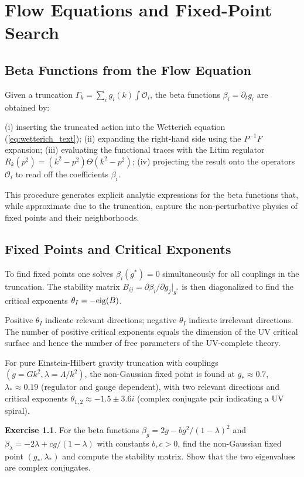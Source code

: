 \documentclass[12pt,a4paper,oneside]{book}
\theoremstyle{definition}
\newtheorem{exercise}{Exercise}[chapter]
\theoremstyle{plain}
\theoremstyle{remark}
\begin{document}
\chapter{Flow Equations and Fixed-Point Search}

\section{Beta Functions from the Flow Equation}

Given a truncation $\Gamma_k = \sum_i g_i(k)\int\mathcal{O}_i$, the beta
functions $\beta_i = \partial_t g_i$ are obtained by:

(i) inserting the truncated action into the Wetterich equation (\ref{eq:wetterich_text});
(ii) expanding the right-hand side using the $P^{-1}F$ expansion;
(iii) evaluating the functional traces with the Litim regulator
$R_k(p^2) = (k^2 - p^2)\Theta(k^2 - p^2)$;
(iv) projecting the result onto the operators $\mathcal{O}_i$ to read off the
coefficients $\beta_i$.

This procedure generates explicit analytic expressions for the beta functions
that, while approximate due to the truncation, capture the non-perturbative
physics of fixed points and their neighborhoods.

\section{Fixed Points and Critical Exponents}

To find fixed points one solves $\beta_i(g^*) = 0$ simultaneously for all
couplings in the truncation. The stability matrix $B_{ij} = \partial\beta_i/\partial g_j|_{g^*}$
is then diagonalized to find the critical exponents $\theta_I = -{\rm eig}(B)$.

Positive $\theta_I$ indicate relevant directions; negative $\theta_I$ indicate
irrelevant directions. The number of positive critical exponents equals the
dimension of the UV critical surface and hence the number of free parameters
of the UV-complete theory.

For pure Einstein-Hilbert gravity truncation with couplings $(g = Gk^2, \lambda = \Lambda/k^2)$,
the non-Gaussian fixed point is found at $g_* \approx 0.7$, $\lambda_* \approx 0.19$
(regulator and gauge dependent), with two relevant directions and critical
exponents $\theta_{1,2} \approx -1.5 \pm 3.6i$ (complex conjugate pair indicating
a UV spiral).

\begin{exercise}
For the beta functions $\beta_g = 2g - bg^2/(1-\lambda)^2$ and
$\beta_\lambda = -2\lambda + cg/(1-\lambda)$ with constants $b, c > 0$, find
the non-Gaussian fixed point $(g_*, \lambda_*)$ and compute the stability matrix.
Show that the two eigenvalues are complex conjugates.
\end{exercise}
\end{document}

